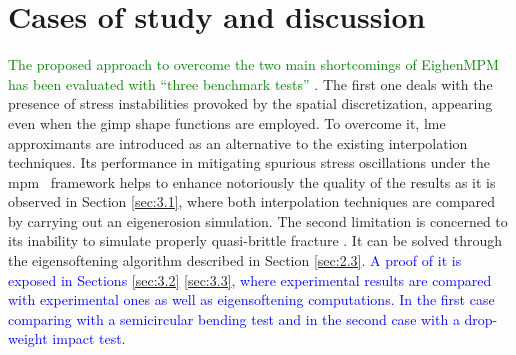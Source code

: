 \documentclass[preprint,12pt,a4paper]{elsarticle}
\newcommand{\MMP}[1]{
  \textcolor{blue}{{#1}}
}
\newcommand{\DM}[1]{
  \textcolor{green}{{#1}}
}
\begin{document}
\section{Cases of study and discussion}
\label{sec:3}

\DM{The proposed approach to overcome the two main shortcomings of
  EighenMPM \cite{Zhang_EE_2020} has been evaluated with ``three
  benchmark tests''}.
The first one deals with the presence of stress
instabilities provoked by the spatial discretization, appearing even when the \acrshort{gimp} shape functions are employed. To overcome it, \acrshort{lme}
approximants are introduced as an alternative to the existing interpolation techniques. Its
performance in mitigating spurious stress oscillations under the \acrshort{mpm}~\cite{Wobbes2020,Molinos2020} framework helps to enhance
notoriously the quality of the results as it is observed in Section
\ref{sec:3.1}, where both interpolation techniques
are compared by carrying out an eigenerosion simulation. The second
limitation is concerned to its inability to simulate properly quasi-brittle
fracture \cite{Navas_2018_ES}. It can be solved through the
eigensoftening algorithm described in Section \ref{sec:2.3}.\MMP{A proof
of it is exposed in Sections \ref{sec:3.2} \ref{sec:3.3}, where experimental results
are compared with experimental ones as well as eigensoftening
computations. In the first case comparing with a semicircular bending
test and in the second case with a drop-weight impact test.}
\end{document}
